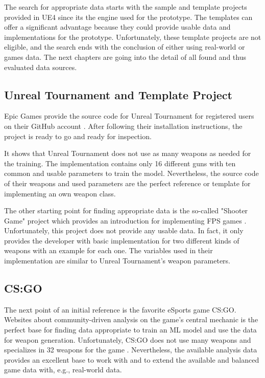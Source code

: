 \documentclass[MGS,Master,english]{twbook}%
\begin{document}
The search for appropriate data starts with the sample and template projects provided in UE4 since its the engine used for the prototype. The templates can offer a significant advantage because they could provide usable data and implementations for the prototype. Unfortunately, these template projects are not eligible, and the search ends with the conclusion of either using real-world or games data. The next chapters are going into the detail of all found and thus evaluated data sources.

\subsection{Unreal Tournament and Template Project}
Epic Games provide the source code for Unreal Tournament for registered users on their GitHub account \cite{epicGames::unrealTournamentSourceCode}. After following their installation instructions, the project is ready to go and ready for inspection.

It shows that Unreal Tournament does not use as many weapons as needed for the training. The implementation contains only 16 different guns with ten common and usable parameters to train the model. Nevertheless, the source code of their weapons and used parameters are the perfect reference or template for implementing an own weapon class.

The other starting point for finding appropriate data is the so-called "Shooter Game" project which provides an introduction for implementing FPS games \cite{epicGames::shooterGame}. Unfortunately, this project does not provide any usable data. In fact, it only provides the developer with basic implementation for two different kinds of weapons with an example for each one. The variables used in their implementation are similar to Unreal Tournament’s weapon parameters.

\subsection{\acl{CS:GO}}
The next point of an initial reference is the favorite eSports game \ac{CS:GO}. Websites about community-driven analysis on the game's central mechanic is the perfect base for finding data appropriate to train an ML model and use the data for weapon generation. Unfortunately, CS:GO does not use many weapons and specializes in 32 weapons for the game \cite{counterstrike::wikiWeapons}. Nevertheless, the available analysis data provides an excellent base to work with and to extend the available and balanced game data with, e.g., real-world data.
\end{document}
